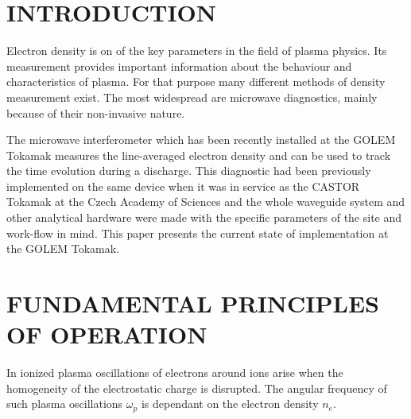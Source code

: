\documentclass[twoside]{articlek}
\begin{document}
\sloppy
{}
\section{INTRODUCTION}
Electron density is on of the key parameters in the field of plasma physics. Its measurement provides important information about the behaviour and characteristics of plasma. For that purpose many different methods of density measurement exist.%
The most widespread are microwave diagnostics, mainly because of their non-invasive nature. 

The microwave interferometer which has been recently installed at the GOLEM Tokamak measures the line-averaged electron density and can be used to track the time evolution during a discharge.%
This diagnostic had been previously implemented on the same device when it was in service as the CASTOR Tokamak %
at the Czech Academy of Sciences and the whole waveguide system and other analytical hardware were made with the specific parameters of the site and work-flow in mind. This paper presents the current state of implementation at the GOLEM Tokamak.

\section{FUNDAMENTAL PRINCIPLES OF OPERATION} %

In ionized plasma oscillations of electrons around ions arise when the homogeneity of the electrostatic charge is disrupted. The angular frequency of such plasma oscillations $\omega_p$ is dependant on the electron density $n_e$. 
\end{document}
